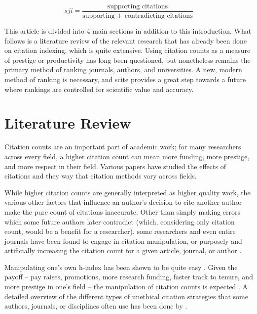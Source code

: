 \documentclass[12pt,english]{article}
\begin{document}
\begin{equation}
    sji = \frac{\text{supporting citations}}{\text{supporting + contradicting citations}}
\end{equation}

This article is divided into 4 main sections in addition to this introduction. What follows is a literature review of the relevant research that has already been done on citation indexing, which is quite extensive. Using citation counts as a measure of prestige or productivity has long been questioned, but nonetheless remains the primary method of ranking journals, authors, and universities. A new, modern method of ranking is necessary, and scite provides a great step towards a future where rankings are controlled for scientific value and accuracy.

\section{Literature Review}\label{sec:litreview}

Citation counts are an important part of academic work; for many researchers across every field, a higher citation count can mean more funding, more prestige, and more respect in their field. Various papers have studied the effects of citations and they way that citation methods vary across fields. 

While higher citation counts are generally interpreted as higher quality work, the various other factors that influence an author's decision to cite another author make the pure count of citations inaccurate. Other than simply making errors which some future authors later contradict (which, considering only citation count, would be a benefit for a researcher), some researchers and even entire journals have been found to engage in citation manipulation, or purposely and artificially increasing the citation count for a given article, journal, or author \citep{bartneck_detecting_2011, perbal_disastrous_2017,  fire_over-optimization_2019}.

Manipulating one's own h-index has been shown to be quite easy \citep{duyx_scientific_2017}. Given the payoff -- pay raises, promotions, more research funding, faster track to tenure, and more prestige in one's field -- the manipulation of citation counts is expected \citep{patience_citation_2017}. A detailed overview of the different types of unethical citation strategies that some authors, journals, or disciplines often use has been done by \cite{moustafa_aberration_2016}.
\end{document}
